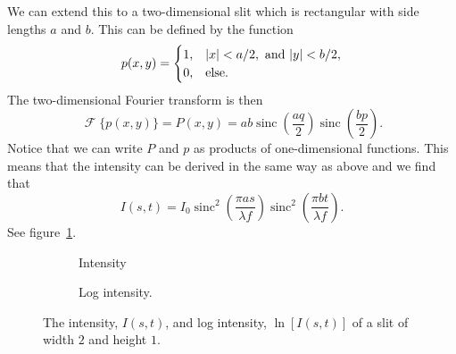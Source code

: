 \documentclass[a4paper]{article}
\newcommand{\FT}{\mathop{\mathcal{F}}}
\DeclareMathOperator{\sinc}{sinc}
\begin{document}
    We can extend this to a two-dimensional slit which is rectangular with side lengths \(a\) and \(b\).
    This can be defined by the function
    \[
        p(x, y) =
        \begin{cases}
            1, & \abs{x} < a/2, \text{ and } \abs{y} < b/2,\\
            0, & \text{else.}
        \end{cases}
    \]
    The two-dimensional Fourier transform is then
    \[\FT\{p(x, y)\} = P(x, y) = ab\sinc\left( \frac{aq}{2} \right)\sinc\left( \frac{bp}{2} \right).\]
    Notice that we can write \(P\) and \(p\) as products of one-dimensional functions.
    This means that the intensity can be derived in the same way as above and we find that
    \[I(s, t) = I_0\sinc^2\left( \frac{\pi a s}{\lambda f} \right)\sinc^2\left( \frac{\pi b t}{\lambda f} \right).\]
    See figure~\ref{fig:rectangular slit}.
    \begin{figure}[ht]
        \centering
        \begin{subfigure}{0.9\textwidth}
            \centering
            \caption{Intensity}
        \end{subfigure}
        \begin{subfigure}{0.9\textwidth}
            \centering
            \caption{Log intensity.}
        \end{subfigure}
        \caption{The intensity, \(I(s, t)\), and log intensity, \(\ln[I(s, t)]\) of a slit of width \(2\) and height \(1\).}
        \label{fig:rectangular slit}
    \end{figure}
\end{document}
